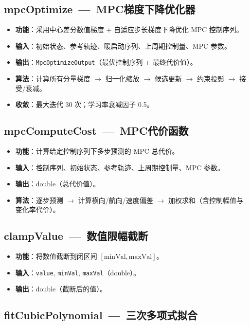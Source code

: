 \documentclass[a4paper,10pt]{article}
\begin{document}
\subsection{mpcOptimize~---~MPC梯度下降优化器}

\begin{itemize}
  \item \textbf{功能}：采用中心差分数值梯度 + 自适应步长梯度下降优化 MPC 控制序列。
  \item \textbf{输入}：初始状态、参考轨迹、暖启动序列、上周期控制量、MPC 参数。
  \item \textbf{输出}：\texttt{MpcOptimizeOutput}（最优控制序列 + 最终代价值）。
  \item \textbf{算法}：计算所有分量梯度 $\to$ 归一化缩放 $\to$ 候选更新 $\to$ 约束投影 $\to$ 接受/衰减。
  \item \textbf{收敛}：最大迭代 30 次；学习率衰减因子 0.5。
\end{itemize}

\subsection{mpcComputeCost~---~MPC代价函数}

\begin{itemize}
  \item \textbf{功能}：计算给定控制序列下多步预测的 MPC 总代价。
  \item \textbf{输入}：控制序列、初始状态、参考轨迹、上周期控制量、MPC 参数。
  \item \textbf{输出}：double（总代价值）。
  \item \textbf{算法}：逐步预测 $\to$ 计算横向/航向/速度偏差 $\to$ 加权求和（含控制幅值与变化率代价）。
\end{itemize}

\subsection{clampValue~---~数值限幅截断}

\begin{itemize}
  \item \textbf{功能}：将数值截断到闭区间 $[\text{minVal}, \text{maxVal}]$。
  \item \textbf{输入}：\texttt{value}, \texttt{minVal}, \texttt{maxVal}（double）。
  \item \textbf{输出}：double（截断后的值）。
\end{itemize}

\subsection{fitCubicPolynomial~---~三次多项式拟合}
\end{document}
